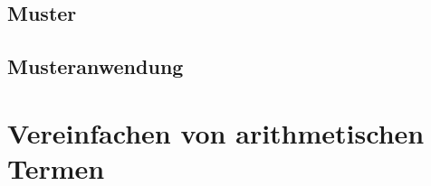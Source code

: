 \documentclass{scrartcl}
\numberwithin{figure}{section} %
\theoremstyle{definition} %
\begin{document}
\subsection{Muster} \label{subsecCppMuster}

\subsection{Musteranwendung} \label{subsecCppMusterAnwendung}

\section{Vereinfachen von arithmetischen Termen}
\end{document}

